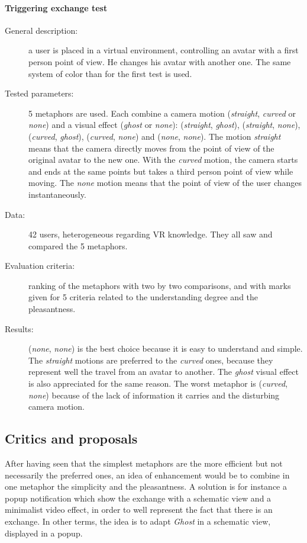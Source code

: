 \documentclass[a4paper]{article}
\begin{document}
\paragraph{Triggering exchange test}
\begin{description}
	\item[General description:] a user is placed in a virtual environment, controlling an avatar with a first person point of view. He changes his avatar with another one. The same system of color than for the first test is used.
	\item[Tested parameters:] 5 metaphors are used. Each combine a camera motion (\textit{straight}, \textit{curved} or \textit{none}) and a visual effect (\textit{ghost} or \textit{none}): (\textit{straight}, \textit{ghost}), (\textit{straight}, \textit{none}), (\textit{curved}, \textit{ghost}), (\textit{curved}, \textit{none}) and (\textit{none}, \textit{none}). The motion \textit{straight} means that the camera directly moves from the point of view of the original avatar to the new one. With the \textit{curved} motion, the camera starts and ends at the same points but takes a third person point of view while moving. The \textit{none} motion means that the point of view of the user changes instantaneously.
	\item[Data:] 42 users, heterogeneous regarding VR knowledge. They all saw and compared   the 5 metaphors.
	\item[Evaluation criteria:] ranking of the metaphors with two by two comparisons, and with marks given for 5 criteria related to the understanding degree and the pleasantness.
	\item[Results:] (\textit{none}, \textit{none}) is the best choice because it is easy to understand and simple. The \textit{straight} motions are preferred to the \textit{curved} ones, because they represent well the travel from an avatar to another. The \textit{ghost} visual effect is also appreciated for the same reason. The worst metaphor is (\textit{curved}, \textit{none}) because of the lack of information it carries and the disturbing camera motion.
\end{description}

\subsection{Critics and proposals}
After having seen that the simplest metaphors are the more efficient but not necessarily the preferred ones, an idea of enhancement would be to combine in one metaphor the simplicity and the pleasantness. A solution is for instance a popup notification which show the exchange with a schematic view and a minimalist video effect, in order to well represent the fact that there is an exchange. In other terms, the idea is to adapt \textit{Ghost} in a schematic view, displayed in a popup.
\end{document}
